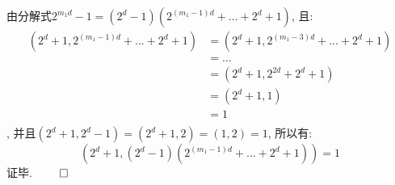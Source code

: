 \documentclass{article}
\begin{document}
\begin{CJK}{UTF8}{gbsn}
  \newline
  由分解式$2^{m_1d} - 1 = (2^d - 1)(2^{(m_1 - 1)d} + ... + 2^d + 1)$, 且:
  \begin{equation*}
    \begin{aligned}
      (2^d + 1, 2^{(m_1 - 1)d} + ... + 2^d + 1) &= (2^d + 1, 2^{(m_1 - 3)d} + ... + 2^d + 1) \\
      &= \dots \\
      &= (2^d + 1, 2^{2d} + 2^d + 1) \\
      &= (2^d + 1, 1) \\
      &= 1 \\
    \end{aligned}
  \end{equation*}
  , 并且$(2^d + 1, 2^d - 1) = (2^d + 1, 2) = (1, 2) = 1$, 所以有:
  \begin{equation*}
    (2^d + 1, (2^d - 1)(2^{(m_1 - 1)d} + ... + 2^d + 1)) = 1
  \end{equation*}
  证毕.
  $\hfill{} \qed$
\end{CJK}
\end{document}
